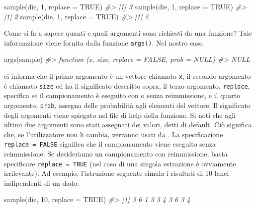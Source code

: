 \documentclass[
  11pt,
]{krantz}
\makeatletter
\newenvironment{Shaded}{\begin{snugshade}}{\end{snugshade}}
\newcommand{\AttributeTok}[1]{\textcolor[rgb]{0.61,0.61,0.61}{#1}}
\newcommand{\CommentTok}[1]{\textcolor[rgb]{0.37,0.37,0.37}{\textit{#1}}}
\newcommand{\ConstantTok}[1]{\textcolor[rgb]{0,0,0}{#1}}
\newcommand{\DecValTok}[1]{\textcolor[rgb]{0.06,0.06,0.06}{#1}}
\newcommand{\FunctionTok}[1]{\textcolor[rgb]{0,0,0}{#1}}
\newcommand{\NormalTok}[1]{#1}
\newenvironment{kframe}{%
\medskip{}
\setlength{\fboxsep}{.8em}
 \def\at@end@of@kframe{}%
 \ifinner\ifhmode%
  \def\at@end@of@kframe{\end{minipage}}%
  \begin{minipage}{\columnwidth}%
 \fi\fi%
 \def\FrameCommand##1{\hskip\@totalleftmargin \hskip-\fboxsep
 \colorbox{shadecolor}{##1}\hskip-\fboxsep
     \hskip-\linewidth \hskip-\@totalleftmargin \hskip\columnwidth}%
 \MakeFramed {\advance\hsize-\width
   \@totalleftmargin\z@ \linewidth\hsize
   \@setminipage}}%
 {\par\unskip\endMakeFramed%
 \at@end@of@kframe}
\renewenvironment{Shaded}{\begin{kframe}}{\end{kframe}}
\theoremstyle{definition}
\theoremstyle{definition}
\theoremstyle{definition}
\theoremstyle{definition}
\theoremstyle{remark}
\makeatother
\begin{document}
\begin{Shaded}
\begin{Highlighting}[]
\FunctionTok{sample}\NormalTok{(die, }\DecValTok{1}\NormalTok{, }\AttributeTok{replace =} \ConstantTok{TRUE}\NormalTok{)}
\CommentTok{\#\textgreater{} [1] 3}
\FunctionTok{sample}\NormalTok{(die, }\DecValTok{1}\NormalTok{, }\AttributeTok{replace =} \ConstantTok{TRUE}\NormalTok{)}
\CommentTok{\#\textgreater{} [1] 2}
\FunctionTok{sample}\NormalTok{(die, }\DecValTok{1}\NormalTok{, }\AttributeTok{replace =} \ConstantTok{TRUE}\NormalTok{)}
\CommentTok{\#\textgreater{} [1] 5}
\end{Highlighting}
\end{Shaded}

Come si fa a sapere quanti e quali argomenti sono richiesti da una funzione? Tale informazione viene fornita dalla funzione \texttt{args()}. Nel nostro caso

\begin{Shaded}
\begin{Highlighting}[]
\FunctionTok{args}\NormalTok{(sample)}
\CommentTok{\#\textgreater{} function (x, size, replace = FALSE, prob = NULL) }
\CommentTok{\#\textgreater{} NULL}
\end{Highlighting}
\end{Shaded}

ci informa che il primo argomento è un vettore chiamato \texttt{x}, il secondo argomento è chiamato \texttt{size} ed ha il significato descritto sopra, il terzo argomento, \texttt{replace}, specifica se il campionamento è eseguito con o senza reimmissione, e il quarto argomento, \texttt{prob}, assegna delle probabilità agli elementi del vettore. Il significato degli argomenti viene spiegato nel file di help della funzione. Si noti che agli ultimi due argomenti sono stati assegnati dei valori, detti di default. Ciò significa che, se l'utilizzatore non li cambia, verranno usati da . La specificazione \texttt{replace\ =\ FALSE} significa che il campionamento viene eseguito senza reimmissione. Se desideriamo un campionamento con reimmissione, basta specificare \texttt{replace\ =\ TRUE} (nel caso di una singola estrazione è ovviamente irrilevante). Ad esempio, l'istruzione seguente simula i risultati di 10 lanci indipendenti di un dado:

\begin{Shaded}
\begin{Highlighting}[]
\FunctionTok{sample}\NormalTok{(die, }\DecValTok{10}\NormalTok{, }\AttributeTok{replace =} \ConstantTok{TRUE}\NormalTok{)}
\CommentTok{\#\textgreater{}  [1] 3 6 1 3 3 4 3 6 3 4}
\end{Highlighting}
\end{Shaded}
\end{document}
